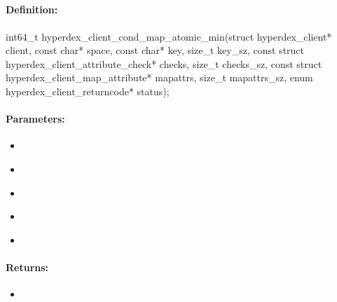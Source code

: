 \pagebreak
\subsection{}
\label{api:c:cond_map_atomic_min}


\paragraph{Definition:}
\begin{ccode}
int64_t hyperdex_client_cond_map_atomic_min(struct hyperdex_client* client,
        const char* space,
        const char* key, size_t key_sz,
        const struct hyperdex_client_attribute_check* checks, size_t checks_sz,
        const struct hyperdex_client_map_attribute* mapattrs, size_t mapattrs_sz,
        enum hyperdex_client_returncode* status);
\end{ccode}

\paragraph{Parameters:}
\begin{itemize}[noitemsep]
\item {}\\

\item {}\\

\item {}\\

\item {}\\

\item {}\\

\end{itemize}

\paragraph{Returns:}
\begin{itemize}[noitemsep]
\item {}\\

\end{itemize}

